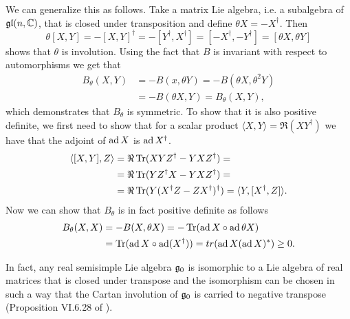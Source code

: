 We can generalize this as follows. Take a matrix Lie algebra, i.e. a subalgebra of $\mathfrak{gl}(n,\mathbb{C})$, that is closed under transposition and define $\theta X = -X^\dag$. Then
 \[
  \theta [X,Y] = -[X,Y]^\dag = - [Y^\dag,X^\dag] = [-X^\dag,-Y^\dag] = [\theta X, \theta Y]
 \]
 shows that $\theta$ is involution. Using the fact that $B$ is invariant with respect to automorphisms we get that
 \begin{align*}
  B_\theta(X,Y) &= -B(x,\theta Y) = - B(\theta X, \theta^2 Y) \\
                &= -B(\theta X, Y) = B_\theta(X,Y),
 \end{align*}
 which demonstrates that $B_\theta$ is symmetric. To show that it is also positive definite, we first need to show that for a scalar product $\langle X,Y \rangle = \Re (XY^\dag)$ we have that the adjoint of $\operatorname{\mathrm{ad}} X$ is $\operatorname{\mathrm{ad}} X^\dag$.
 \begin{align*}
  \langle [X,Y],Z \rangle &= \Re\tr (XYZ^\dag - YXZ^\dag) = \\
			  &= \Re\tr (YZ^\dag X - YXZ^\dag) =  \\%
                          &= \Re\tr( Y(X^\dag Z - ZX^\dag)^\dag) = \langle Y, [X^\dag,Z] \rangle.
 \end{align*}
 Now we can show that $B_\theta$ is in fact positive definite as follows
 \begin{align*}
  B_\theta(X,X) &= -B(X,\theta X) = -\operatorname{\mathrm{Tr}} (\operatorname{\mathrm{ad}} X \circ \operatorname{\mathrm{ad}} \theta X )\\
                &= \operatorname{\mathrm{Tr}} (\operatorname{\mathrm{ad}} X \circ \operatorname{\mathrm{ad}} (X^\dag))  = tr (\operatorname{\mathrm{ad}} X (\operatorname{\mathrm{ad}} X)^*) \geq 0.
 \end{align*}

In fact, any real semisimple Lie algebra $\mathfrak{g}_0$ is isomorphic to a Lie algebra of real matrices that is closed under transpose and the isomorphism can be chosen in such a way that the Cartan involution of $\mathfrak{g}_0$ is carried to negative transpose (Proposition VI.6.28 of \cite{knapp}).

